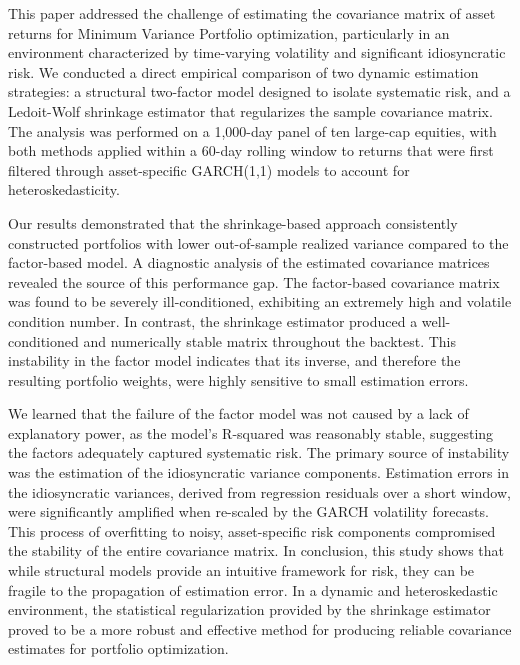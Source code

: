 \documentclass[]{article}
\begin{document}
This paper addressed the challenge of estimating the covariance matrix of asset returns for Minimum Variance Portfolio optimization, particularly in an environment characterized by time-varying volatility and significant idiosyncratic risk. We conducted a direct empirical comparison of two dynamic estimation strategies: a structural two-factor model designed to isolate systematic risk, and a Ledoit-Wolf shrinkage estimator that regularizes the sample covariance matrix. The analysis was performed on a 1,000-day panel of ten large-cap equities, with both methods applied within a 60-day rolling window to returns that were first filtered through asset-specific GARCH(1,1) models to account for heteroskedasticity.

Our results demonstrated that the shrinkage-based approach consistently constructed portfolios with lower out-of-sample realized variance compared to the factor-based model. A diagnostic analysis of the estimated covariance matrices revealed the source of this performance gap. The factor-based covariance matrix was found to be severely ill-conditioned, exhibiting an extremely high and volatile condition number. In contrast, the shrinkage estimator produced a well-conditioned and numerically stable matrix throughout the backtest. This instability in the factor model indicates that its inverse, and therefore the resulting portfolio weights, were highly sensitive to small estimation errors.

We learned that the failure of the factor model was not caused by a lack of explanatory power, as the model's R-squared was reasonably stable, suggesting the factors adequately captured systematic risk. The primary source of instability was the estimation of the idiosyncratic variance components. Estimation errors in the idiosyncratic variances, derived from regression residuals over a short window, were significantly amplified when re-scaled by the GARCH volatility forecasts. This process of overfitting to noisy, asset-specific risk components compromised the stability of the entire covariance matrix. In conclusion, this study shows that while structural models provide an intuitive framework for risk, they can be fragile to the propagation of estimation error. In a dynamic and heteroskedastic environment, the statistical regularization provided by the shrinkage estimator proved to be a more robust and effective method for producing reliable covariance estimates for portfolio optimization.
\end{document}
